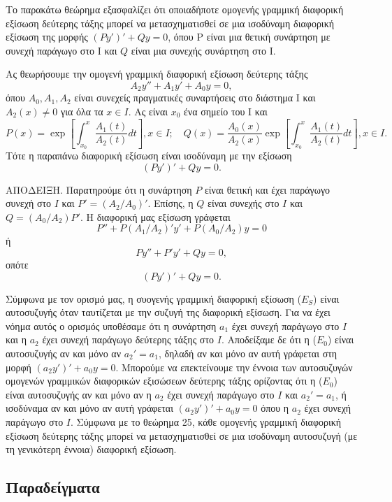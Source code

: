 \documentclass[11pt,a4paper,twoside]{book}
\newcommand{\titlefont}[1]{{\fontfamily{maksf}\selectfont #1}}
\newcounter{thewrhma}[chapter]
\renewcommand{\thethewrhma}{\thechapter.\arabic{thewrhma}}
\newcommand{\thewr}{\refstepcounter{thewrhma}{\bf\titlefont{\textcolor{secondarycolor}{\large Θεώρημα\hspace{2mm}\thethewrhma}}}\hspace{1mm}}{}
\newenvironment{Thewrhma}[1]
{\begin{tcolorbox}[title=\thewr\ \ :\ \  {\textcolor{black}{\bf{\large\titlefont{#1}}}},
breakable,
enhanced standard,
titlerule=-.2pt,
toprule=0pt, 
rightrule=0pt, 
bottomrule=0pt,
colback=white,
left=2mm,
top=1mm,
bottom=0mm,
boxrule=0pt,
colframe=white,
borderline west={1.5mm}{0pt}{secondarycolor},
leftrule=2mm,
sharp corners,
coltitle=secondarycolor]}
{\end{tcolorbox}}
\begin{document}
Το παρακάτω θεώρημα εξασφαλίζει ότι οποιαδήποτε ομογενής γραμμική διαφορική εξίσωση δεύτερης τάξης μπορεί να μετασχηματισθεί σε μια ισοδύναμη διαφορική εξίσωση της μορφής $(Py')'+Qy=0$, όπου P είναι μια θετική συνάρτηση με συνεχή παράγωγο στο Ι και $Q$ είναι μια συνεχής συνάρτηση στο Ι.

\begin{Thewrhma}{}
Ας θεωρήσουμε την ομογενή γραμμική διαφορική εξίσωση δεύτερης τάξης
\[
    A_2y''+A_1y'+A_0y=0,
\]
όπου $A_0, A_1, A_2$ είναι συνεχείς πραγματικές συναρτήσεις στο διάστημα Ι και $A_2(x)\neq 0$ για όλα τα $x\in I$. Ας είναι $x_0$ ένα σημείο του Ι και
\[
    P(x)=\exp\left[\int_{x_0}^x\frac{A_1(t)}{A_2(t)}dt\right], x\in I; \quad Q(x)=\frac{A_0(x)}{A_2(x)}\exp\left[\int_{x_0}^x\frac{A_1(t)}{A_2(t)}dt\right], x\in I.
\]
Τότε η παραπάνω διαφορική εξίσωση είναι ισοδύναμη με την εξίσωση
\[
    (Py')'+Qy=0.
\]
\end{Thewrhma}
ΑΠΟΔΕΙΞΗ. Παρατηρούμε ότι η συνάρτηση $P$ είναι θετική και έχει παράγωγο συνεχή στο $I$ και $P'=(A_2/A_0)'$. Επίσης, η $Q$ είναι συνεχής στο $I$ και $Q = (A_0/A_2)P'$. Η διαφορική μας εξίσωση γράφεται
\[ P''+P(A_1/A_2)'y'+P(A_0/A_2)y=0 \]
ή
\[ Py''+P'y'+Qy=0, \]
οπότε
\[ (Py')'+Qy=0. \]

Σύμφωνα με τον ορισμό μας, η συογενής γραμμική διαφορική εξίσωση ($E_S$) είναι αυτοσυζυγής όταν ταυτίζεται με την συζυγή της διαφορική εξίσωση. Για να έχει νόημα αυτός ο ορισμός υποθέσαμε ότι η συνάρτηση $a_1$ έχει συνεχή παράγωγο στο $I$ και η $a_2$ έχει συνεχή παράγωγο δεύτερης τάξης στο $I$. Αποδείξαμε δε ότι η ($E_0$) είναι αυτοσυζυγής αν και μόνο αν $a_2'=a_1$, δηλαδή αν και μόνο αν αυτή γράφεται στη μορφή $(a_2y')'+a_0y=0$. Μπορούμε να επεκτείνουμε την έννοια των αυτοσυζυγών ομογενών γραμμικών διαφορικών εξισώσεων δεύτερης τάξης ορίζοντας ότι η ($E_0$) είναι αυτοσυζυγής αν και μόνο αν η $a_2$ έχει συνεχή παράγωγο στο $I$ και $a_2'=a_1$, ή ισοδύναμα αν και μόνο αν αυτή γράφεται $(a_2y')'+a_0y=0$ όπου η $a_2$ έχει συνεχή παράγωγο στο $I$. Σύμφωνα με το θεώρημα 25, κάθε ομογενής γραμμική διαφορική εξίσωση δεύτερης τάξης μπορεί να μετασχηματισθεί σε μια ισοδύναμη αυτοσυζυγή (με τη γενικότερη έννοια) διαφορική εξίσωση.

\subsection{Παραδείγματα}
\end{document}
